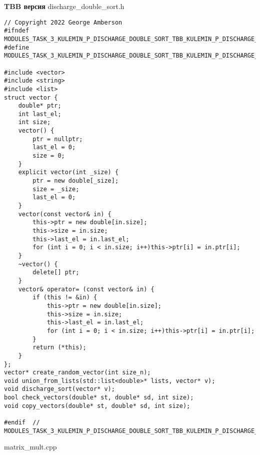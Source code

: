 \documentclass{report}
\begin{document}
\textbf{TBB версия}
\newline
\newline discharge\_double\_sort.h
\begin{lstlisting}
// Copyright 2022 George Amberson
#ifndef MODULES_TASK_3_KULEMIN_P_DISCHARGE_DOUBLE_SORT_TBB_KULEMIN_P_DISCHARGE_DOUBLE_SORT_TBB_H_
#define MODULES_TASK_3_KULEMIN_P_DISCHARGE_DOUBLE_SORT_TBB_KULEMIN_P_DISCHARGE_DOUBLE_SORT_TBB_H_

#include <vector>
#include <string>
#include <list>
struct vector {
    double* ptr;
    int last_el;
    int size;
    vector() {
        ptr = nullptr;
        last_el = 0;
        size = 0;
    }
    explicit vector(int _size) {
        ptr = new double[_size];
        size = _size;
        last_el = 0;
    }
    vector(const vector& in) {
        this->ptr = new double[in.size];
        this->size = in.size;
        this->last_el = in.last_el;
        for (int i = 0; i < in.size; i++)this->ptr[i] = in.ptr[i];
    }
    ~vector() {
        delete[] ptr;
    }
    vector& operator= (const vector& in) {
        if (this != &in) {
            this->ptr = new double[in.size];
            this->size = in.size;
            this->last_el = in.last_el;
            for (int i = 0; i < in.size; i++)this->ptr[i] = in.ptr[i];
        }
        return (*this);
    }
};
vector* create_random_vector(int size_n);
void union_from_lists(std::list<double>* lists, vector* v);
void discharge_sort(vector* v);
bool check_vectors(double* st, double* sd, int size);
void copy_vectors(double* st, double* sd, int size);

#endif  // MODULES_TASK_3_KULEMIN_P_DISCHARGE_DOUBLE_SORT_TBB_KULEMIN_P_DISCHARGE_DOUBLE_SORT_TBB_H_
\end{lstlisting}
matrix\_mult.cpp
\end{document}
